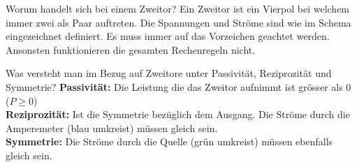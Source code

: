 
\begin{karte}{Worum handelt sich bei einem Zweitor?}
	Ein Zweitor ist ein Vierpol bei welchem immer zwei als Paar auftreten. Die Spannungen und Ströme sind wie im Schema eingezeichnet definiert. Es muss immer auf das Vorzeichen geachtet werden. Ansonsten funktionieren die gesamten Rechenregeln nicht.
	
	\centering{\scalebox{.9}{}}	
\end{karte}

\begin{karte}{Was versteht man im Bezug auf Zweitore unter Passivität, Reziprozität und Symmetrie?}
	\textbf{Passivität:} Die Leistung die das Zweitor aufnimmt ist grösser als 0 ($P\ge 0$)\\
	\textbf{Reziprozität:} Ist die Symmetrie bezüglich dem Ausgang. Die Ströme durch die Amperemeter (blau umkreist) müssen gleich sein.\\
	\textbf{Symmetrie:} Die Ströme durch die Quelle (grün umkreist) müssen ebenfalls gleich sein.
	
	\centering{\scalebox{.7}{}}
\end{karte}
